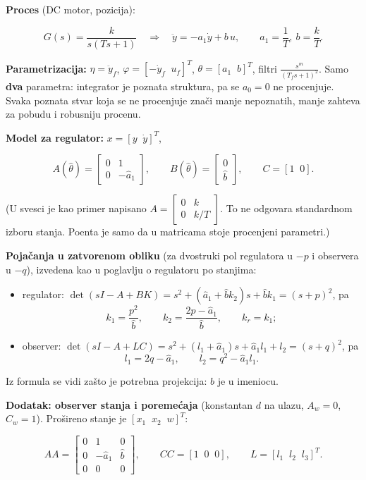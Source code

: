\documentclass[11pt,a4paper,parskip=half,headsepline,numbers=noenddot]{scrartcl}
\begin{document}
\textbf{Proces} (DC motor, pozicija):

\[G(s) = \frac{k}{s(Ts+1)}\quad\Rightarrow\quad \ddot y = -a_1\dot y + b\,u,\qquad a_1 = \frac1T,\ b = \frac kT .\]

\textbf{Parametrizacija:} \(\eta = \ddot y_f\), \(\varphi = [-\dot y_f\;\; u_f]^T\), \(\theta = [a_1\;\; b]^T\), filtri \(\frac{s^m}{(T_fs+1)^2}\). Samo \textbf{dva} parametra: integrator je poznata struktura, pa se \(a_0 = 0\) ne procenjuje. Svaka poznata stvar koja se ne procenjuje znači manje nepoznatih, manje zahteva za pobudu i robusniju procenu.

\textbf{Model za regulator:} \(x = [y\;\; \dot y]^T\),

\[A(\hat\theta) = \begin{bmatrix}0 & 1\\ 0 & -\hat a_1\end{bmatrix},\qquad B(\hat\theta) = \begin{bmatrix}0\\ \hat b\end{bmatrix},\qquad C = [1\;\; 0].\]

(U svesci je kao primer napisano \(A = \begin{bmatrix}0 & k\\ 0 & k/T\end{bmatrix}\). To ne odgovara standardnom izboru stanja. Poenta je samo da u matricama stoje procenjeni parametri.)

\textbf{Pojačanja u zatvorenom obliku} (za dvostruki pol regulatora u \(-p\) i observera u \(-q\)), izvedena kao u poglavlju o regulatoru po stanjima:

\begin{itemize}
\item regulator: \(\det(sI - A + BK) = s^2 + (\hat a_1 + \hat bk_2)s + \hat bk_1 = (s+p)^2\), pa
  \[k_1 = \frac{p^2}{\hat b},\qquad k_2 = \frac{2p - \hat a_1}{\hat b},\qquad k_r = k_1;\]
\item observer: \(\det(sI - A + LC) = s^2 + (l_1 + \hat a_1)s + \hat a_1l_1 + l_2 = (s+q)^2\), pa
  \[l_1 = 2q - \hat a_1,\qquad l_2 = q^2 - \hat a_1l_1 .\]
\end{itemize}

Iz formula se vidi zašto je potrebna projekcija: \(\hat b\) je u imeniocu.

\textbf{Dodatak: observer stanja i poremećaja} (konstantan \(d\) na ulazu, \(A_w = 0\), \(C_w = 1\)). Prošireno stanje je \([x_1\;\; x_2\;\; w]^T\):

\[AA = \begin{bmatrix}0 & 1 & 0\\ 0 & -\hat a_1 & \hat b\\ 0 & 0 & 0\end{bmatrix},\qquad CC = [1\;\; 0\;\; 0],\qquad L = [l_1\;\; l_2\;\; l_3]^T .\]
\end{document}
